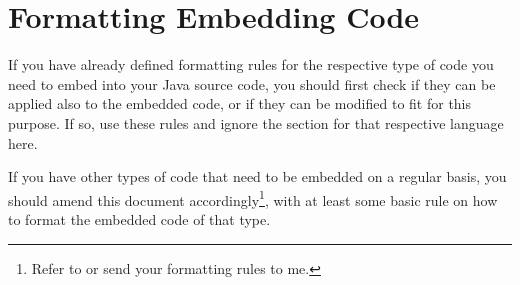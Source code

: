 \section{Formatting Embedding Code}\label{sec:FormattingEmbeddingCode}
If you have already defined formatting rules for the respective type of code you need to embed into your Java source code, you should first check if they can be applied also to the embedded code, or if they can be modified to fit for this purpose. If so, use these rules and ignore the section for that respective language here.

If you have other types of code that need to be embedded on a regular basis, you should amend this document accordingly\footnote{Refer to  or send your formatting rules to me.}, with at least some basic rule on how to format the embedded code of that type.








